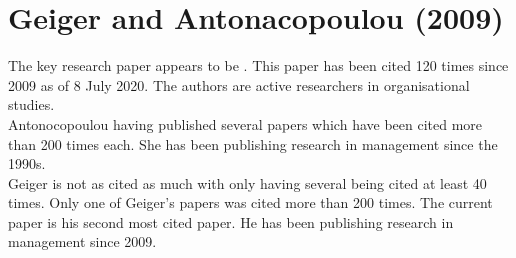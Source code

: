 \section{Geiger and Antonacopoulou (2009)}

The key research paper appears to be \cite{geiger2009narratives}. This paper has been cited 120 times since 2009 as of 8 July 2020. The authors are active researchers in organisational studies.\\

Antonocopoulou having published several papers which have been cited more than 200 times each. She has been publishing research in management since the 1990s.\\

Geiger is not as cited as much with only having several being cited at least 40 times. Only one of Geiger's papers was cited more than 200 times. The current paper is his second most cited paper. He has been publishing research in management since 2009.\\

